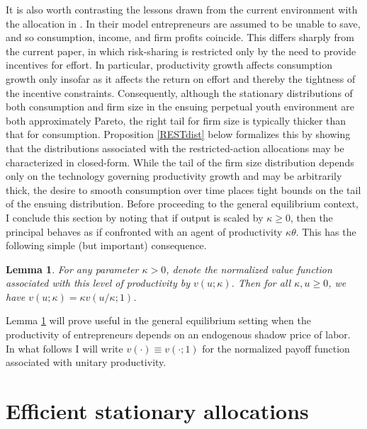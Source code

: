\documentclass[11pt]{article}
\theoremstyle{plain}
\newtheorem{lemma}[thm]{Lemma}
\begin{document}

It is also worth contrasting the lessons drawn from the current environment with the allocation in \cite{jones_schumpeterian_2018}. In their model entrepreneurs are assumed to be unable to save, and so consumption, income, and firm profits coincide. This differs sharply from the current paper, in which risk-sharing is restricted only by the need to provide incentives for effort. In particular, productivity growth affects consumption growth only insofar as it affects the return on effort and thereby the tightness of the incentive constraints. Consequently, although the stationary distributions of both consumption and firm size in the ensuing perpetual youth environment are both approximately Pareto, the right tail for firm size is typically thicker than that for consumption. Proposition \ref{RESTdist} below formalizes this by showing that the distributions associated with the restricted-action allocations may be characterized in closed-form. While the tail of the firm size distribution depends only on the technology governing productivity growth and may be arbitrarily thick, the desire to smooth consumption over time places tight bounds on the tail of the ensuing distribution. Before proceeding to the general equilibrium context, I conclude this section by noting that if output is scaled by $\kappa \geq 0$, then the principal behaves as if confronted with an agent of productivity $\kappa \theta$. This has the following simple (but important) consequence.

\begin{lemma} \label{scalehomog}
For any parameter $\kappa > 0$, denote the normalized value function associated with this level of productivity by $v(u;\kappa)$. Then for all $\kappa, u \geq0$, we have $v(u; \kappa) = \kappa v(u/\kappa; 1)$.
\end{lemma}

\noindent Lemma \ref{scalehomog} will prove useful in the general equilibrium setting when the productivity of entrepreneurs depends on an endogenous shadow price of labor. In what follows I will write $v(\cdot) \equiv v(\cdot;1)$ for the normalized payoff function associated with unitary productivity.

\section{Efficient stationary allocations} \label{GenEq}
\end{document}
